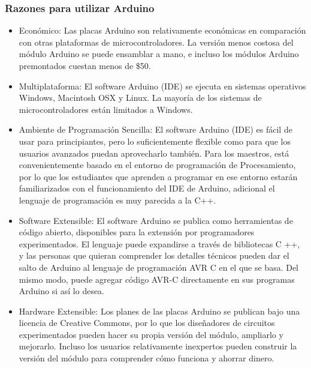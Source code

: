 		\subsubsection{Razones para utilizar Arduino}
			\begin{itemize}
				\item Económico: 
				Las placas Arduino son relativamente económicas en comparación con otras plataformas de microcontroladores. La versión menos costosa del módulo Arduino se puede ensamblar a mano, e incluso los módulos Arduino premontados cuestan menos de \$50.
				
				\item Multiplataforma: El software Arduino (IDE) se ejecuta en sistemas operativos Windows, Macintosh OSX y Linux. La mayoría de los sistemas de microcontroladores están limitados a Windows.
				
				\item Ambiente de Programación Sencilla: El software Arduino (IDE) es fácil de usar para principiantes, pero lo suficientemente flexible como para que los usuarios avanzados puedan aprovecharlo también. Para los maestros, está convenientemente basado en el entorno de programación de Procesamiento, por lo que los estudiantes que aprenden a programar en ese entorno estarán familiarizados con el funcionamiento del IDE de Arduino, adicional el lenguaje de programación es muy parecida a la C++.
				
				\item Software Extensible: El software Arduino se publica como herramientas de código abierto, disponibles para la extensión por programadores experimentados. El lenguaje puede expandirse a través de bibliotecas C ++, y las personas que quieran comprender los detalles técnicos pueden dar el salto de Arduino al lenguaje de programación AVR C en el que se basa. Del mismo modo, puede agregar código AVR-C directamente en sus programas Arduino si así lo desea.
				
				\item Hardware Extensible: 
				Los planes de las placas Arduino se publican bajo una licencia de Creative Commons, por lo que los diseñadores de circuitos experimentados pueden hacer su propia versión del módulo, ampliarlo y mejorarlo. Incluso los usuarios relativamente inexpertos pueden construir la versión del módulo para comprender cómo funciona y ahorrar dinero.
			\end{itemize}
		
		\newpage
		\thispagestyle{plain}
		

